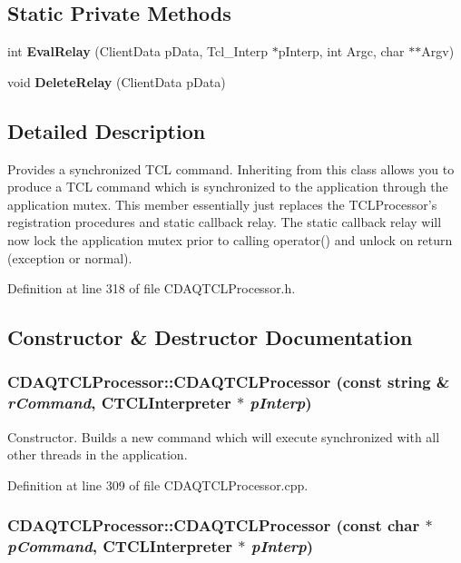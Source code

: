 \subsection*{Static Private Methods}
\begin{CompactItemize}
\item 
int {\bf Eval\-Relay} (Client\-Data p\-Data, Tcl\_\-Interp $\ast$p\-Interp, int Argc, char $\ast$$\ast$Argv)
\item 
void {\bf Delete\-Relay} (Client\-Data p\-Data)
\end{CompactItemize}


\subsection{Detailed Description}
Provides a synchronized TCL command. Inheriting from this class allows you to produce a TCL command which is synchronized to the application through the application mutex. This member essentially just replaces the TCLProcessor's registration procedures and static callback relay. The static callback relay will now lock the application mutex prior to calling operator() and unlock on return (exception or normal). 



Definition at line 318 of file CDAQTCLProcessor.h.

\subsection{Constructor \& Destructor Documentation}
\subsubsection{\setlength{\rightskip}{0pt plus 5cm}CDAQTCLProcessor::CDAQTCLProcessor (const string \& {\em r\-Command}, {\bf CTCLInterpreter} $\ast$ {\em p\-Interp})}\label{classCDAQTCLProcessor_a0}


Constructor. Builds a new command which will execute synchronized with all other threads in the application. 

Definition at line 309 of file CDAQTCLProcessor.cpp.
\subsubsection{\setlength{\rightskip}{0pt plus 5cm}CDAQTCLProcessor::CDAQTCLProcessor (const char $\ast$ {\em p\-Command}, {\bf CTCLInterpreter} $\ast$ {\em p\-Interp})}\label{classCDAQTCLProcessor_a1}



